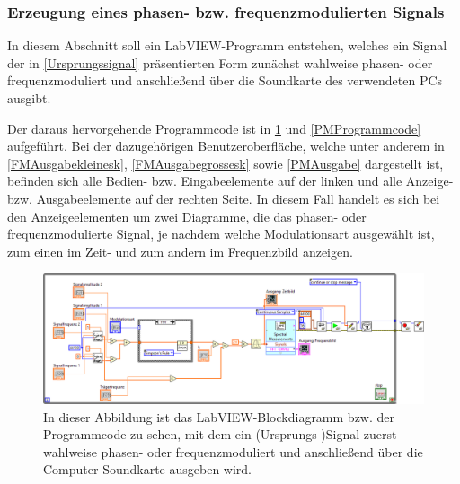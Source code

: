 \documentclass[
a4paper,
12pt,
pagesize,
ngerman
]{scrartcl}
\begin{document}
	\subsubsection{Erzeugung eines phasen- bzw. frequenzmodulierten Signals} \label{FMPMErzeugung}
		
	In diesem Abschnitt soll ein LabVIEW-Programm entstehen, welches ein Signal der in \cref{Ursprungssignal} präsentierten Form zunächst wahlweise phasen- oder frequenzmoduliert und anschließend über die Soundkarte des verwendeten PCs ausgibt. 
	
	Der daraus hervorgehende Programmcode ist in \cref{FMProgrammcode} und \cref{PMProgrammcode} aufgeführt. 
	Bei der dazugehörigen Benutzeroberfläche, welche unter anderem in \cref{FMAusgabekleinesk}, \cref{FMAusgabegrossesk} sowie \cref{PMAusgabe} dargestellt ist, befinden sich alle Bedien- bzw. Eingabeelemente auf der linken und alle Anzeige- bzw. Ausgabeelemente auf der rechten Seite. 
	In diesem Fall handelt es sich bei den Anzeigeelementen um zwei Diagramme, die das phasen- oder frequenzmodulierte Signal, je nachdem welche Modulationsart ausgewählt ist, zum einen im Zeit- und zum andern im Frequenzbild anzeigen. 

	\begin{figure}[H]
		\centering
		\includegraphics[width=1.0\textwidth]{EIRE2018Dateien/Tag4/FMPM-Erzeugung/FMPM-Erzeugungd}
		\caption{In dieser Abbildung ist das LabVIEW-Blockdiagramm bzw. der Programmcode zu sehen, mit dem ein (Ursprungs-)Signal zuerst wahlweise phasen- oder frequenzmoduliert und anschließend über die Computer-Soundkarte ausgeben wird.}
		\label{FMProgrammcode}
	\end{figure}
\end{document}
